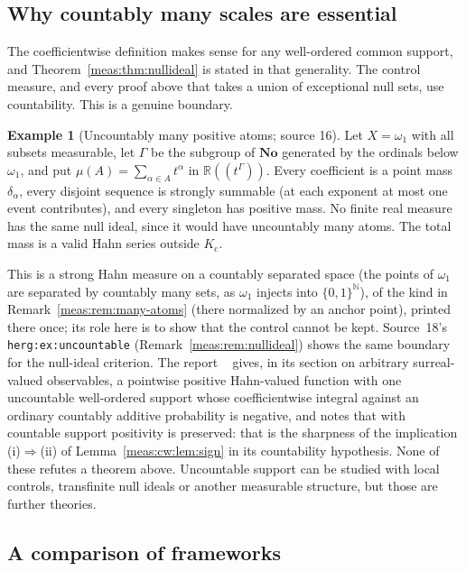\documentclass[11pt]{article}
\numberwithin{equation}{section}
\theoremstyle{definition}
\newtheorem{example}[theorem]{Example}
\theoremstyle{remark}
\newcommand{\R}{\mathbb R}
\newcommand{\N}{\mathbb N}
\newcommand{\No}{\mathbf{No}}
\newcommand{\Kc}{K_{\mathrm c}}
\begin{document}
\subsection{Why countably many scales are essential}

The coefficientwise definition makes sense for any well-ordered common support,
and Theorem~\ref{meas:thm:nullideal} is stated in that generality. The control
measure, and every proof above that takes a union of exceptional null sets, use
countability. This is a genuine boundary.

\begin{example}[Uncountably many positive atoms; source 16]\label{meas:cw:ex:omega1}
Let $X=\omega_1$ with all subsets measurable, let $\Gamma$ be the subgroup of $\No$
generated by the ordinals below $\omega_1$, and put $\mu(A)=\sum_{\alpha\in A}t^\alpha$ in
$\R((t^\Gamma))$. Every coefficient is a point mass $\delta_\alpha$, every disjoint
sequence is strongly summable (at each exponent at most one event contributes),
and every singleton has positive mass. No finite real measure has the same null
ideal, since it would have uncountably many atoms. The total mass is a valid
Hahn series outside $\Kc$.
\end{example}

This is a strong Hahn measure on a countably separated space (the points of
$\omega_1$ are separated by countably many sets, as $\omega_1$ injects into
$\{0,1\}^{\N}$), of the kind in Remark~\ref{meas:rem:many-atoms} (there
normalized by an anchor point), printed there once; its role here is to show that the control cannot be kept. Source~18's
\texttt{herg:ex:uncountable} (Remark~\ref{meas:rem:nullideal}) shows the same
boundary for the null-ideal criterion. The report
~\cite{repofsp} gives, in its section on
arbitrary surreal-valued observables, a pointwise positive Hahn-valued function
with one uncountable well-ordered support whose coefficientwise integral against
an ordinary countably additive probability is negative, and notes that with
countable support positivity is preserved: that is the sharpness of the
implication (i)$\Rightarrow$(ii) of Lemma~\ref{meas:cw:lem:sign} in its countability
hypothesis. None of these refutes a theorem above. Uncountable support can be
studied with local controls, transfinite null ideals or another measurable
structure, but those are further theories.

\subsection{A comparison of frameworks}
\end{document}
